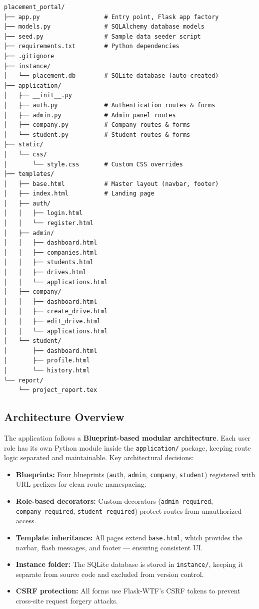 \documentclass[12pt,a4paper]{article}
\begin{document}
\begin{verbatim}
placement_portal/
├── app.py                  # Entry point, Flask app factory
├── models.py               # SQLAlchemy database models
├── seed.py                 # Sample data seeder script
├── requirements.txt        # Python dependencies
├── .gitignore
├── instance/
│   └── placement.db        # SQLite database (auto-created)
├── application/
│   ├── __init__.py
│   ├── auth.py             # Authentication routes & forms
│   ├── admin.py            # Admin panel routes
│   ├── company.py          # Company routes & forms
│   └── student.py          # Student routes & forms
├── static/
│   └── css/
│       └── style.css       # Custom CSS overrides
├── templates/
│   ├── base.html           # Master layout (navbar, footer)
│   ├── index.html          # Landing page
│   ├── auth/
│   │   ├── login.html
│   │   └── register.html
│   ├── admin/
│   │   ├── dashboard.html
│   │   ├── companies.html
│   │   ├── students.html
│   │   ├── drives.html
│   │   └── applications.html
│   ├── company/
│   │   ├── dashboard.html
│   │   ├── create_drive.html
│   │   ├── edit_drive.html
│   │   └── applications.html
│   └── student/
│       ├── dashboard.html
│       ├── profile.html
│       └── history.html
└── report/
    └── project_report.tex
\end{verbatim}

\subsection{Architecture Overview}
The application follows a \textbf{Blueprint-based modular architecture}. Each user role
has its own Python module inside the \texttt{application/} package, keeping route logic
separated and maintainable. Key architectural decisions:

\begin{itemize}[leftmargin=*]
    \item \textbf{Blueprints:} Four blueprints (\texttt{auth}, \texttt{admin},
          \texttt{company}, \texttt{student}) registered with URL prefixes for clean
          route namespacing.
    \item \textbf{Role-based decorators:} Custom decorators (\texttt{admin\_required},
          \texttt{company\_required}, \texttt{student\_required}) protect routes from
          unauthorized access.
    \item \textbf{Template inheritance:} All pages extend \texttt{base.html}, which provides
          the navbar, flash messages, and footer --- ensuring consistent UI.
    \item \textbf{Instance folder:} The SQLite database is stored in \texttt{instance/},
          keeping it separate from source code and excluded from version control.
    \item \textbf{CSRF protection:} All forms use Flask-WTF's CSRF tokens to prevent
          cross-site request forgery attacks.
\end{itemize}
\end{document}

